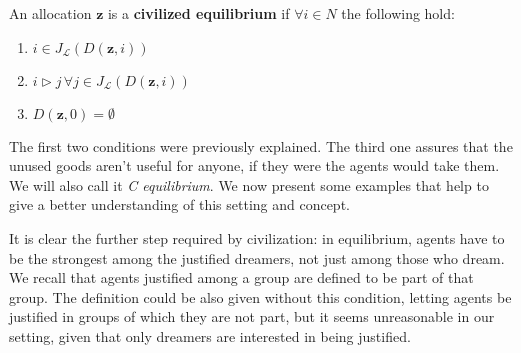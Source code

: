 \begin{definition}\label{Cequilibrium}
    An allocation $\textbf{z}$ is a \textbf{civilized equilibrium} if $\forall i\in N$ the following hold:
    \begin{enumerate}
        \item $i\in J_{\mathcal{L}}(D(\textbf{z},i))$
        \item $i\triangleright j\,\forall j\in J_{\mathcal{L}}(D(\textbf{z},i))$
        \item $D(\textbf{z},0)=\emptyset$
    \end{enumerate}
\end{definition}

The first two conditions were previously explained. The third one assures that the unused goods aren't useful for anyone, if they were the agents would take them. We will also call it \textit{C equilibrium}. We now present some examples that help to give a better understanding of this setting and concept.





It is clear the further step required by civilization: in equilibrium, agents have to be the strongest among the justified dreamers, not just among those who dream. We recall that agents justified among a group are defined to be part of that group. The definition could be also given without this condition, letting agents be justified in groups of which they are not part, but it seems unreasonable in our setting, given that only dreamers are interested in being justified.

